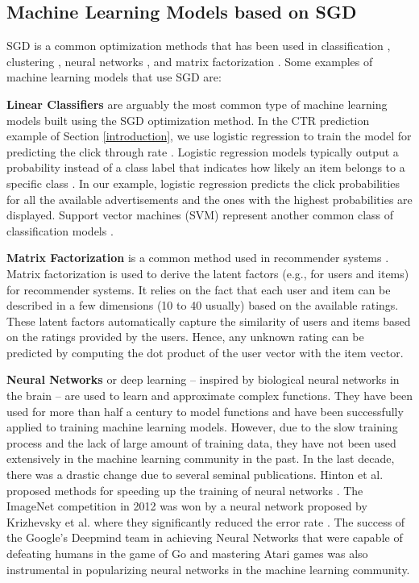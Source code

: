 \documentclass[10pt,conference,letterpaper]{IEEEtran}
\begin{document}
\subsection{Machine Learning Models based on SGD}\label{subsec:ml-models-sgd}
SGD is a common optimization methods that has been used in classification \cite{zhang2004solving}, clustering \cite{bottou1995convergence}, neural networks \cite{dean2012large}, and matrix factorization \cite{funk2006netflix}.
Some examples of machine learning models that use SGD are: 

\textbf{Linear Classifiers} are arguably the most common type of machine learning models built using the SGD optimization method. 
In the CTR prediction example of Section \ref{introduction}, we use logistic regression to train the model for predicting the click through rate \cite{macmahan2013}. 
Logistic regression models typically output a probability instead of a class label that indicates how likely an item belongs to a specific class \cite{hosmer2013applied}.
In our example, logistic regression predicts the click probabilities for all the available advertisements and the ones with the highest probabilities are displayed.
Support vector machines (SVM) represent another common class of classification models \cite{steinwart2008support}.

\textbf{Matrix Factorization} is a common method used in recommender systems \cite{koren2009matrix}. 
Matrix factorization is used to derive the latent factors (e.g., for users and items) for recommender systems.
It relies on the fact that each user and item can be described in a few dimensions (10 to 40 usually) based on the available ratings.
These latent factors automatically capture the similarity of users and items based on the ratings provided by the users.
Hence, any unknown rating can be predicted by computing the dot product of the user vector with the item vector.

\textbf{Neural Networks} or deep learning -- inspired by biological neural networks in the brain -- are used to learn and approximate complex functions. 
They have been used for more than half a century to model functions and have been successfully applied to training machine learning models.
However, due to the slow training process and the lack of large amount of training data, they have not been used extensively in the machine learning community in the past.
In the last decade, there was a drastic change due to several seminal publications.
Hinton et al. proposed methods for speeding up the training of neural networks \cite{hinton2006fast}.
The ImageNet competition \cite{ILSVRC15} in 2012 was won by a neural network proposed by Krizhevsky et al. where they significantly reduced the error rate \cite{krizhevsky2012imagenet}. 
The success of the Google's Deepmind team in achieving Neural Networks that were capable of defeating humans in the game of Go \cite{silver2016mastering} and mastering Atari games \cite{mnih2013playing} was also instrumental in popularizing neural networks in the machine learning community.
\end{document}
